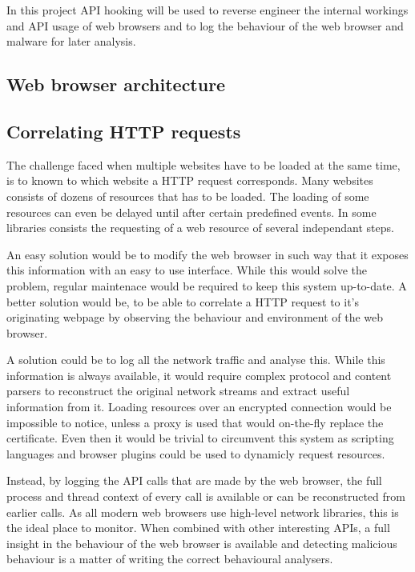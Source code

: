 In this project API hooking will be used to reverse engineer the internal workings and API usage of web browsers and to log the behaviour of the web browser and malware for later analysis.

\subsection{Web browser architecture}


\subsection{Correlating HTTP requests}

The challenge faced when multiple websites have to be loaded at the same time, is to known to which website a HTTP request corresponds. Many websites consists of dozens of resources that has to be loaded. The loading of some resources can even be delayed until after certain predefined events. In some libraries consists the requesting of a web resource of several independant steps.

An easy solution would be to modify the web browser in such way that it exposes this information with an easy to use interface. While this would solve the problem, regular maintenace would be required to keep this system up-to-date. A better solution would be, to be able to correlate a HTTP request to it's originating webpage by observing the behaviour and environment of the web browser.

A solution could be to log all the network traffic and analyse this. While this information is always available, it would require complex protocol and content parsers to reconstruct the original network streams and extract useful information from it. Loading resources over an encrypted connection would be impossible to notice, unless a proxy is used that would on-the-fly replace the certificate. Even then it would be trivial to circumvent this system as scripting languages and browser plugins could be used to dynamicly request resources.

Instead, by logging the API calls that are made by the web browser, the full process and thread context of every call is available or can be reconstructed from earlier calls. As all modern web browsers use high-level network libraries, this is the ideal place to monitor. When combined with other interesting APIs, a full insight in the behaviour of the web browser is available and detecting malicious behaviour is a matter of writing the correct behavioural analysers.
